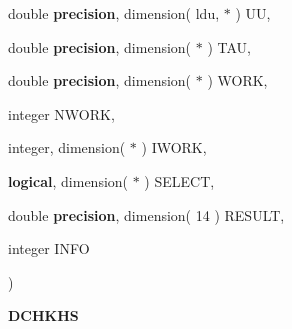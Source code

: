 {\begin{DoxyParamCaption}
\item[{double {\bf precision}, dimension( ldu, $\ast$ )}]{U\+U, }
\item[{double {\bf precision}, dimension( $\ast$ )}]{T\+A\+U, }
\item[{double {\bf precision}, dimension( $\ast$ )}]{W\+O\+R\+K, }
\item[{integer}]{N\+W\+O\+R\+K, }
\item[{integer, dimension( $\ast$ )}]{I\+W\+O\+R\+K, }
\item[{{\bf logical}, dimension( $\ast$ )}]{S\+E\+L\+E\+C\+T, }
\item[{double {\bf precision}, dimension( 14 )}]{R\+E\+S\+U\+L\+T, }
\item[{integer}]{I\+N\+F\+O}
\end{DoxyParamCaption}
)}\label{group__double__eig_ga1c7d85c04f03e5a109a04a119293910b}


{\bfseries D\+C\+H\+K\+H\+S} 

